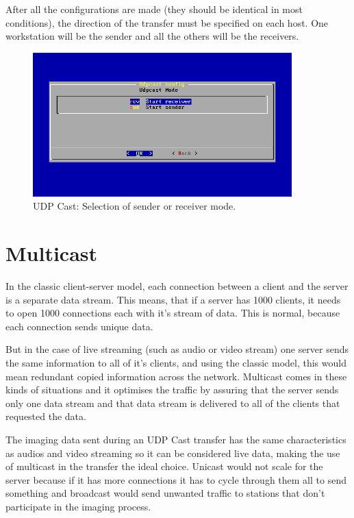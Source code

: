After all the configurations are made (they should be identical in most
conditions), the direction of the transfer must be specified on each host.
One workstation will be the sender and all the others will be the
receivers.

\begin{figure}[h]
\includegraphics[width=10cm]{img/udpcast_mode}
\caption{UDP Cast: Selection of sender or receiver mode.}
\label{fig:udpcast_mode}
\end{figure}



\section{Multicast}

In the classic client-server model, each connection between a client and
the server is a separate data stream. This means, that if a server has 1000
clients, it needs to open 1000 connections each with it's stream of data.
This is normal, because each connection sends unique data.

But in the case of live streaming (such as audio or video stream) one
server sends the same information to all of it's clients, and using the
classic model, this would mean redundant copied information across the
network. Multicast comes in these kinds of situations and it optimises
the traffic by assuring that the server sends only one data stream and that
data stream is delivered to all of the clients that requested the data.

The imaging data sent during an UDP Cast transfer has the same
characteristics as audios and video streaming so it can be considered live
data, making the use of multicast in the transfer the ideal choice. Unicast
would not scale for the server because if it has more connections it has to
cycle through them all to send something and broadcast would send unwanted
traffic to stations that don't participate in the imaging process.

